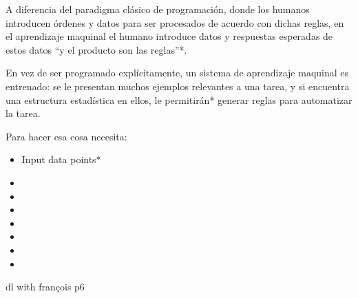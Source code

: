 A diferencia del paradigma clásico de programación, donde los humanos introducen órdenes y datos para ser procesados de acuerdo con dichas reglas, en el aprendizaje maquinal el humano introduce datos y respuestas esperadas de estos datos ``y el producto son las reglas''*.

En vez de ser programado explícitamente, un sistema de aprendizaje maquinal es entrenado: se le presentan muchos ejemplos relevantes a una tarea, y si encuentra una estructura estadística en ellos, le permitirán* generar reglas para automatizar la tarea.

Para hacer esa cosa necesita:
\begin{itemize}
    \item Input data points*
    \item
    \item
    \item
    \item
    \item
    \item
    \item
\end{itemize}


dl with françois p6